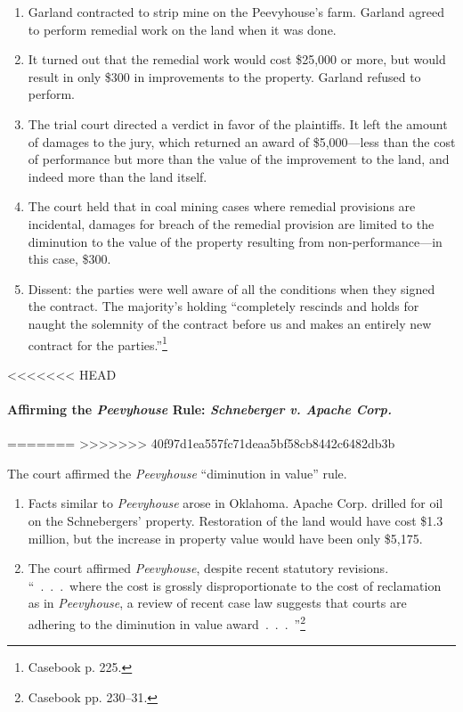 \begin{enumerate}
    \item Garland contracted to strip mine on the Peevyhouse's farm. Garland 
    agreed to perform remedial work on the land when it was done.
    \item It turned out that the remedial work would cost \$25,000 or more, 
    but would result in only \$300 in improvements to the property. Garland 
    refused to perform.
    \item The trial court directed a verdict in favor of the plaintiffs. It 
    left the amount of damages to the jury, which returned an award of 
    \$5,000---less than the cost of performance but more than the value of the 
    improvement to the land, and indeed more than the land itself.
    \item The court held that in coal mining cases where remedial provisions 
    are incidental, damages for breach of the remedial provision are limited 
    to the diminution to the value of the property resulting from 
    non-performance---in this case, \$300.
    \item Dissent: the parties were well aware of all the conditions when they 
    signed the contract. The majority's holding ``completely rescinds and 
    holds for naught the solemnity of the contract before us and makes an 
    entirely new contract for the parties.''\footnote{Casebook p. 225.}
\end{enumerate}

<<<<<<< HEAD
\paragraph{Affirming the \emph{Peevyhouse} Rule: \emph{Schneberger v. Apache 
Corp.}}
=======
>>>>>>> 40f97d1ea557fc71deaa5bf58cb8442c6482db3b

The court affirmed the \emph{Peevyhouse} ``diminution in value'' rule.

\begin{enumerate}
    \item Facts similar to \emph{Peevyhouse} arose in Oklahoma. Apache Corp. 
    drilled for oil on the Schnebergers' property. Restoration of the land 
    would have cost \$1.3 million, but the increase in property value would 
    have been only \$5,175. 
    \item The court affirmed \emph{Peevyhouse}, despite recent statutory 
    revisions. ``~.~.~.~where the cost is grossly disproportionate to the cost 
    of reclamation as in \emph{Peevyhouse}, a review of recent case law 
    suggests that courts are adhering to the diminution in value 
    award~.~.~.~''\footnote{Casebook pp. 230--31.}
\end{enumerate}

